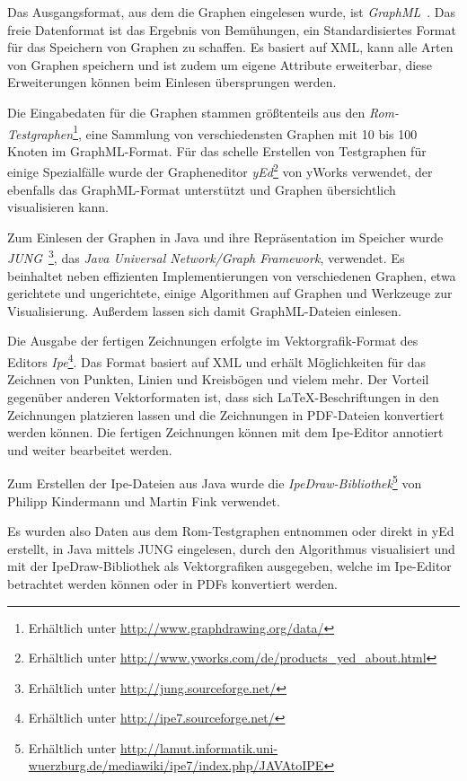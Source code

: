\documentclass[a4paper]{scrreprt}
\theoremstyle{definition}
\begin{document}
Das Ausgangsformat, aus dem die Graphen eingelesen wurde, ist \emph{GraphML}~\cite{brandes+al-14}. Das freie Datenformat ist das Ergebnis von Bemühungen, ein Standardisiertes Format für das Speichern von Graphen zu schaffen. Es basiert auf XML, kann alle Arten von Graphen speichern und ist zudem um eigene Attribute erweiterbar, diese Erweiterungen können beim Einlesen übersprungen werden.

Die Eingabedaten für die Graphen stammen größtenteils aus den \emph{Rom-Testgraphen}\footnote{Erhältlich unter \url{http://www.graphdrawing.org/data/}}, eine Sammlung von verschiedensten Graphen mit 10 bis 100 Knoten im GraphML-Format. Für das schelle Erstellen von Testgraphen für einige Spezialfälle wurde der Grapheneditor \emph{yEd}\footnote{Erhältlich unter \url{http://www.yworks.com/de/products_yed_about.html}} von yWorks verwendet, der ebenfalls das GraphML-Format unterstützt und Graphen übersichtlich visualisieren kann.

Zum Einlesen der Graphen in Java und ihre Repräsentation im Speicher wurde \emph{JUNG}~\cite{jung}\footnote{Erhältlich unter \url{http://jung.sourceforge.net/}}, das \emph{Java Universal Network/Graph Framework}, verwendet. Es beinhaltet neben effizienten Implementierungen von verschiedenen Graphen, etwa gerichtete und ungerichtete, einige Algorithmen auf Graphen und Werkzeuge zur Visualisierung. Außerdem lassen sich damit GraphML-Dateien einlesen.

Die Ausgabe der fertigen Zeichnungen erfolgte im Vektorgrafik-Format des Editors \emph{Ipe}\footnote{Erhältlich unter \url{http://ipe7.sourceforge.net/}}. Das Format basiert auf XML und erhält Möglichkeiten für das Zeichnen von Punkten, Linien und Kreisbögen und vielem mehr. Der Vorteil gegenüber anderen Vektorformaten ist, dass sich \LaTeX-Beschriftungen in den Zeichnungen platzieren lassen und die Zeichnungen in PDF-Dateien konvertiert werden können. Die fertigen Zeichnungen können mit dem Ipe-Editor annotiert und weiter bearbeitet werden.

Zum Erstellen der Ipe-Dateien aus Java wurde die \emph{IpeDraw-Bibliothek}\footnote{Erhältlich unter \url{http://lamut.informatik.uni-wuerzburg.de/mediawiki/ipe7/index.php/JAVAtoIPE}} von Philipp Kindermann und Martin Fink verwendet.

Es wurden also Daten aus dem Rom-Testgraphen entnommen oder direkt in yEd erstellt, in Java mittels JUNG eingelesen, durch den Algorithmus visualisiert und mit der IpeDraw-Bibliothek als Vektorgrafiken ausgegeben, welche im Ipe-Editor betrachtet werden können oder in PDFs konvertiert werden.
\end{document}
